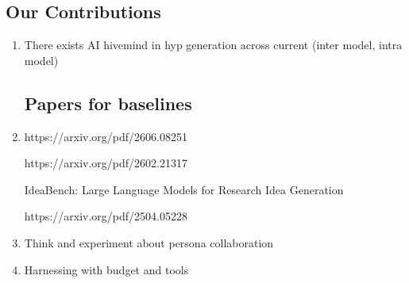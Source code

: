 \subsection{Our Contributions}
\begin{enumerate}
\item There exists AI hivemind in hyp generation across current (inter model, intra model)
\subsection{Papers for baselines}
\item https://arxiv.org/pdf/2606.08251

https://arxiv.org/pdf/2602.21317

IdeaBench: Large Language Models for Research Idea Generation

https://arxiv.org/pdf/2504.05228
\item Think and experiment about persona collaboration
\item Harnessing with budget and tools


\end{enumerate}
